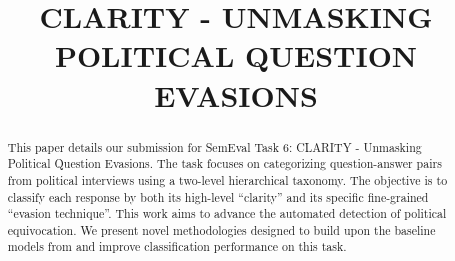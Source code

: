 \documentclass[conference]{IEEEtran}
\begin{document}
\title{CLARITY - UNMASKING POLITICAL QUESTION EVASIONS}

\author{
\and
{}
\and
{}
\and
{}
\and
{}
\and
{}
}

\maketitle

\begin{abstract}
This paper details our submission for SemEval Task 6: CLARITY - Unmasking Political Question Evasions. The task focuses on categorizing question-answer pairs from political interviews using a two-level hierarchical taxonomy. The objective is to classify each response by both its high-level ``clarity'' and its specific fine-grained ``evasion technique''. This work aims to advance the automated detection of political equivocation. We present novel methodologies designed to build upon the baseline models from \cite{b4} and improve classification performance on this task.
\end{abstract}
\end{document}
